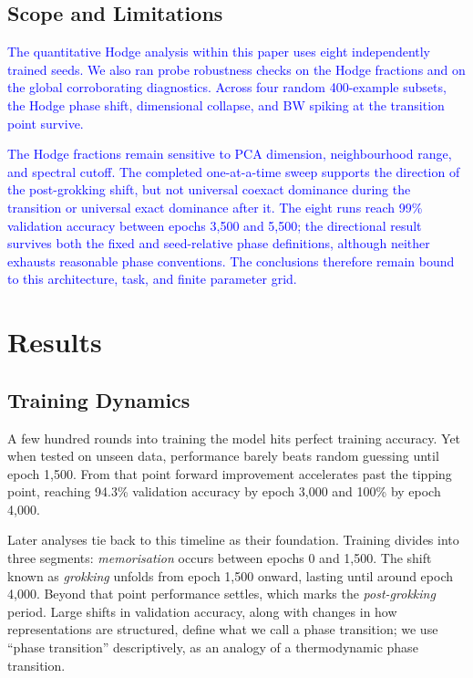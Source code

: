 \documentclass[11pt]{article}
\newcommand{\addedtext}[1]{\textcolor{blue}{#1}}
\theoremstyle{remark}
\begin{document}
\subsection{Scope and Limitations}

\addedtext{The quantitative Hodge analysis within this paper uses eight independently trained seeds. We also ran probe robustness checks on the Hodge fractions and on the global corroborating diagnostics. Across four random 400-example subsets, the Hodge phase shift, dimensional collapse, and BW spiking at the transition point survive.}

\addedtext{The Hodge fractions remain sensitive to PCA dimension, neighbourhood range, and spectral cutoff. The completed one-at-a-time sweep supports the direction of the post-grokking shift, but not universal coexact dominance during the transition or universal exact dominance after it. The eight runs reach 99\% validation accuracy between epochs 3{,}500 and 5{,}500; the directional result survives both the fixed and seed-relative phase definitions, although neither exhausts reasonable phase conventions. The conclusions therefore remain bound to this architecture, task, and finite parameter grid.}

\section{Results}

\subsection{Training Dynamics}

A few hundred rounds into training the model hits perfect training accuracy. Yet when tested on unseen data, performance barely beats random guessing until epoch 1{,}500. From that point forward improvement accelerates past the tipping point, reaching 94.3\% validation accuracy by epoch 3{,}000 and 100\% by epoch 4{,}000.

Later analyses tie back to this timeline as their foundation. Training divides into three segments: \emph{memorisation} occurs between epochs 0 and 1{,}500. The shift known as \emph{grokking} unfolds from epoch 1{,}500 onward, lasting until around epoch 4{,}000. Beyond that point performance settles, which marks the \emph{post-grokking} period. Large shifts in validation accuracy, along with changes in how representations are structured, define what we call a phase transition; we use ``phase transition'' descriptively, as an analogy of a thermodynamic phase transition.
\end{document}
